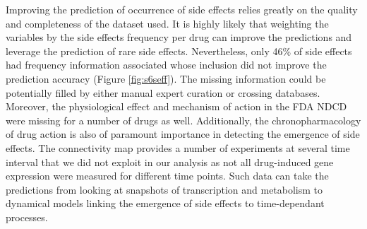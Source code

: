 Improving the prediction of occurrence of side effects relies greatly on the quality and completeness of the dataset used. It is highly likely that weighting the variables by the side effects frequency per drug can improve the predictions and leverage the prediction of rare side effects. Nevertheless, only 46\% of side effects had frequency information associated whose inclusion did not improve the prediction accuracy (Figure \ref{fig:s6seff}). The missing information could be potentially filled by either manual expert curation or crossing databases. Moreover, the physiological effect and mechanism of action in the FDA NDCD were missing for a number of drugs as well. 
Additionally, the chronopharmacology of drug action is also of paramount importance in detecting the emergence of side effects. The connectivity map provides a number of experiments at several time interval that we did not exploit in our analysis as not all drug-induced gene expression were measured for different time points. Such data can take the predictions from looking at snapshots of transcription and metabolism to dynamical models linking the emergence of  side effects to time-dependant processes.
